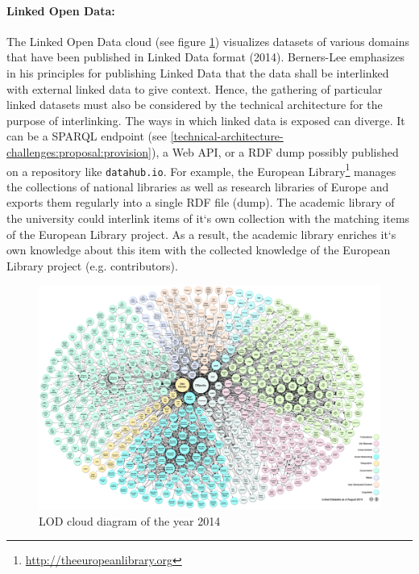 \documentclass{article}
\begin{document}
\paragraph{Linked Open Data:} The Linked Open Data cloud (see figure \ref{fig:lod-cloud-diagram}) visualizes datasets of various domains that have been published in Linked Data format (2014)\cite{_linking_????}. Berners-Lee emphasizes in his principles for publishing Linked Data that the data shall be interlinked with external linked data to give context. Hence, the gathering of particular linked datasets must also be considered by the technical architecture for the purpose of interlinking. The ways in which linked data is exposed can diverge. It can be a SPARQL endpoint (see \ref{technical-architecture-challenges:proposal:provision}), a Web API, or a RDF dump possibly published on a repository like \texttt{datahub.io}. For example, the European Library\footnote{\url{http://theeuropeanlibrary.org}} manages the collections of national libraries as well as research libraries of Europe and exports them regularly into a single RDF file (dump). The academic library of the university could interlink items of it`s own collection with the matching items of the European Library project. As a result, the academic library enriches it`s own knowledge about this item with the collected knowledge of the European Library project (e.g. contributors).

\begin{figure}[H]
\centering \includegraphics*[width=1.0\columnwidth]{images/technical-architecture/lod-cloud_colored_1000px.png}
\caption{LOD cloud diagram of the year 2014}
\label{fig:lod-cloud-diagram}
\end{figure}
\end{document}
